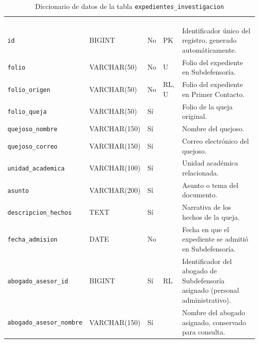 \footnotesize
\renewcommand{\arraystretch}{1.15}
\setlength{\tabcolsep}{4pt}
\begin{longtable}{|L{3.9cm}|L{2.4cm}|L{0.9cm}|L{1.2cm}|L{6.6cm}|}
	\hiderowcolors\caption{Diccionario de datos de la tabla \texttt{expedientes\_investigacion}}
	\label{tab:cap3_dic_expedientes_investigacion} \\ \showrowcolors
	\hline
	 &  &  &  &  \\
	\hline
	\endfirsthead
	\hline
	 &  &  &  &  \\
	\hline
	\endhead
		\texttt{id} & BIGINT & No & PK & Identificador único del registro, generado automáticamente. \\ \hline
		\texttt{folio} & VARCHAR(50) & No & U & Folio del expediente en Subdefensoría. \\ \hline
		\texttt{folio\_\allowbreak{}origen} & VARCHAR(50) & No & RL, U & Folio del expediente en Primer Contacto. \\ \hline
		\texttt{folio\_\allowbreak{}queja} & VARCHAR(50) & Sí &  & Folio de la queja original. \\ \hline
		\texttt{quejoso\_\allowbreak{}nombre} & VARCHAR(150) & Sí &  & Nombre del quejoso. \\ \hline
		\texttt{quejoso\_\allowbreak{}correo} & VARCHAR(150) & Sí &  & Correo electrónico del quejoso. \\ \hline
		\texttt{unidad\_\allowbreak{}academica} & VARCHAR(100) & Sí &  & Unidad académica relacionada. \\ \hline
		\texttt{asunto} & VARCHAR(200) & Sí &  & Asunto o tema del documento. \\ \hline
		\texttt{descripcion\_\allowbreak{}hechos} & TEXT & Sí &  & Narrativa de los hechos de la queja. \\ \hline
		\texttt{fecha\_\allowbreak{}admision} & DATE & No &  & Fecha en que el expediente se admitió en Subdefensoría. \\ \hline
		\texttt{abogado\_\allowbreak{}asesor\_\allowbreak{}id} & BIGINT & Sí & RL & Identificador del abogado de Subdefensoría asignado (personal administrativo). \\ \hline
		\texttt{abogado\_\allowbreak{}asesor\_\allowbreak{}nombre} & VARCHAR(150) & Sí &  & Nombre del abogado asignado, conservado para consulta. \\ \hline

\end{longtable}
